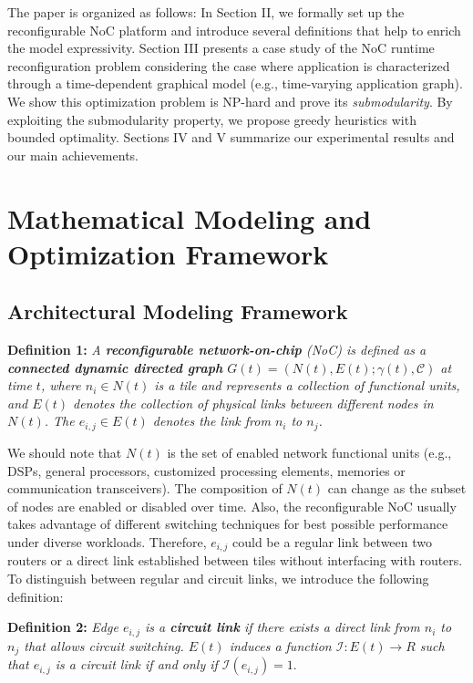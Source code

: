 The paper is organized as follows: In Section II, we formally set up the reconfigurable NoC platform and introduce several definitions that help to enrich the model expressivity. Section III presents a case study of the NoC runtime reconfiguration problem considering the case where application is characterized through a time-dependent graphical model (e.g., time-varying application graph). We show this optimization problem is NP-hard and prove its \textit{submodularity}. By exploiting the submodularity property, we propose greedy heuristics with bounded optimality. Sections IV and V summarize our experimental results and our main achievements.

\section{Mathematical Modeling and Optimization Framework}
\subsection{Architectural Modeling Framework}
\noindent \textbf{Definition 1:}\label{def:noc} \textit{A \textbf{reconfigurable network-on-chip} (NoC) is defined as a \textbf{connected dynamic directed graph} $G(t)=(N(t),E(t);\gamma(t),\mathcal C)$ at time $t$, where $n_{i} \in N(t)$ is a tile and represents a collection of functional units, and $E(t)$ denotes the collection of physical links between different nodes in $N(t)$. The $e_{i,j} \in E(t)$ denotes the link from $n_{i}$ to $n_{j}$.}

We should note that $N(t)$ is the set of enabled network functional units (e.g.,  DSPs, general processors, customized processing elements, memories or communication transceivers). The composition of $N(t)$ can change as the subset of nodes are enabled or disabled over time. Also, the reconfigurable NoC usually takes advantage of different switching techniques for best possible performance under diverse workloads.  Therefore, $e_{i,j}$ could be a regular link between two routers or a direct link established between tiles without interfacing with routers. To distinguish between regular and circuit links, we introduce the following definition:

\noindent \textbf{Definition 2:}{ \textit{Edge $e_{i,j}$ is a \textbf{circuit link} if there exists a direct link from $n_{i}$ to $n_{j}$ that allows circuit switching. $E(t)$ induces a function $\mathcal I: E(t) \rightarrow R$ such that $e_{i,j}$ is a circuit link if and only if $\mathcal I(e_{i,j})=1$}.}\label{def:circuit}

